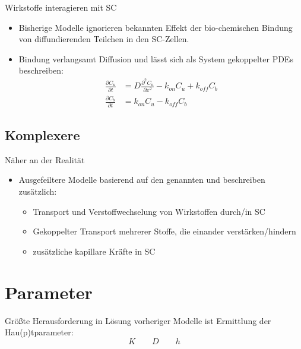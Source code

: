 \documentclass[utf8x,compress,professionalfonts]{beamer}
\begin{document}
\begin{frame}{Wirkstoffe interagieren mit SC}
  \begin{itemize}
    \item<1-> Bisherige Modelle ignorieren bekannten Effekt der bio-chemischen Bindung
      von diffundierenden Teilchen in den SC-Zellen.
      \bigskip
    \item<2-> Bindung verlangsamt Diffusion und l\"asst sich als System gekoppelter PDEs
      beschreiben:
      \begin{align}
        \frac{\partial C_u}{\partial t} &= D\frac{\partial^2 C_u}{\partial x^2}-k_{on}C_u+k_{off}C_b \\
        \frac{\partial C_b}{\partial t} &= k_{on}C_u - k_{off}C_b
      \end{align}
  \end{itemize}
\end{frame}

\subsection{Komplexere}
\begin{frame}{N\"aher an der Realit\"at}
  \begin{itemize}
    \item Ausgefeiltere Modelle basierend auf den genannten und beschreiben
      zus\"atzlich:
      \bigskip
      \begin{itemize}
        \item<2-> Transport und Verstoffwechselung von Wirkstoffen durch/in SC
          \bigskip
        \item<3-> Gekoppelter Transport mehrerer Stoffe, die einander verst\"arken/hindern
          \bigskip
        \item<4-> zus\"atzliche kapillare Kr\"afte in SC
          \bigskip
      \end{itemize}
  \end{itemize}
\end{frame}

\section{Parameter}
\begin{frame}{}
  \begin{center}
    Gr\"o\ss{}te Herausforderung in L\"osung vorheriger Modelle ist Ermittlung
    der Hau(p)tparameter:
    \bigskip
    $$K\qquad D\qquad h$$
  \end{center}
\end{frame}
\end{document}
